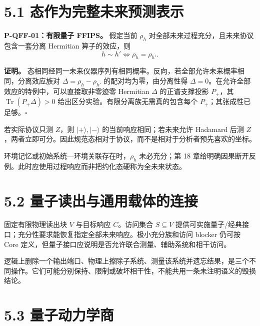 \documentclass[
  11pt,
  oneside]{book}
\begin{document}
\hypertarget{ux6001ux4f5cux4e3aux5b8cux6574ux672aux6765ux9884ux6d4bux8868ux793a}{%
\section{5.1
态作为完整未来预测表示}\label{ux6001ux4f5cux4e3aux5b8cux6574ux672aux6765ux9884ux6d4bux8868ux793a}}

\protect\hypertarget{p-qff-01}{}{}

\textbf{P-QFF-01：有限量子 FFIPS。} 假定当前 \(\rho_h\)
对全部未来过程充分，且未来协议包含一套分离 Hermitian 算子的效应，则 \[
h\sim h'\iff\rho_h=\rho_{h'}.
\]

\textbf{证明。}
态相同经同一未来仪器序列有相同概率。反向，若全部允许未来概率相同，分离效应族对
\(\Delta=\rho_h-\rho_{h'}\) 的配对均为零，由分离性得
\(\Delta=0\)。在允许全部效应的特例中，可以直接取非零迹零 Hermitian
\(\Delta\) 的正谱支撑投影 \(P_+\)，其 \(\operatorname{Tr}(P_+\Delta)>0\)
给出区分实验。有限分离族无需真的包含每个
\(P_+\)；其张成性已足够。\(\square\)

若实际协议只测 \(Z\)，则 \(|+\rangle,|-\rangle\)
的当前响应相同；若未来允许 Hadamard 后测
\(Z\)，两者立即可分。因此规范态相对于协议，而不是相对于分析者预先喜欢的坐标。

环境记忆或初始系统---环境关联存在时，\(\rho_h\) 未必充分；第 18
章给明确因果断开反例。此时应使用过程响应而非把约化态硬称为全未来状态。

\hypertarget{ux91cfux5b50ux8bfbux51faux4e0eux901aux7528ux8f7dux4f53ux7684ux8fdeux63a5}{%
\section{5.2
量子读出与通用载体的连接}\label{ux91cfux5b50ux8bfbux51faux4e0eux901aux7528ux8f7dux4f53ux7684ux8fdeux63a5}}

固定有限物理读出块 \(V\) 与目标响应 \(C\)。访问集合 \(S\subseteq V\)
提供可实施量子/经典接口；充分性要求能恢复指定全部未来响应。极小充分族和访问
blocker 仍可按 Core
定义，但量子接口应说明是否允许联合测量、辅助系统和相干访问。

逻辑上删除一个输出端口、物理上擦除子系统、测量该系统并遗忘结果，是三个不同操作。它们可能分别保持、限制或破坏相干性，不能共用一条未注明语义的毁损结论。

\hypertarget{ux91cfux5b50ux52a8ux529bux5b66ux5546}{%
\section{5.3 量子动力学商}\label{ux91cfux5b50ux52a8ux529bux5b66ux5546}}
\end{document}
